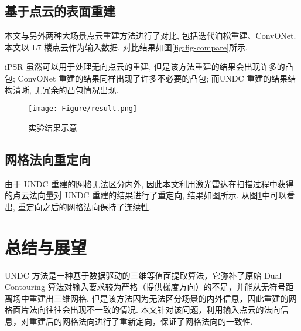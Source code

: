 \subsection{基于点云的表面重建}
本文与另外两种大场景点云重建方法进行了对比, 包括迭代泊松重建\cite{hou2022iterative}、ConvONet\cite{tang2021sa}. 本文以 L7 楼点云作为输入数据, 对比结果如图\ref{fig:fig-compare}所示. 

iPSR 虽然可以用于处理无向点云的重建, 但是该方法重建的结果会出现许多的凸包; ConvONet 重建的结果同样出现了许多不必要的凸包; 而UNDC 重建的结果结构清晰, 无冗余的凸包情况出现. 

\begin{figure}[H]
	\center
	\texttt{[image: Figure/result.png]}
	\centering
	\caption{实验结果示意}\label{fig:fig-result}
\end{figure}
\subsection{网格法向重定向} \label{reorientation}
由于 UNDC 重建的网格无法区分内外, 因此本文利用激光雷达在扫描过程中获得的点云法向量对 UNDC 重建的结果进行了重定向, 结果如图所示. 从图\ref{fig:fig-result}中可以看出, 重定向之后的网格法向保持了连续性. 

\section{总结与展望}
UNDC 方法是一种基于数据驱动的三维等值面提取算法，它弥补了原始 Dual Contouring 算法对输入要求较为严格（提供梯度方向）的不足，并能从无符号距离场中重建出三维网格. 但是该方法因为无法区分场景的内外信息，因此重建的网格面片法向往往会出现不一致的情况. 本文针对该问题，利用输入点云的法向信息，对重建后的网格法向进行了重新定向，保证了网格法向的一致性. 

\printbibliography%
